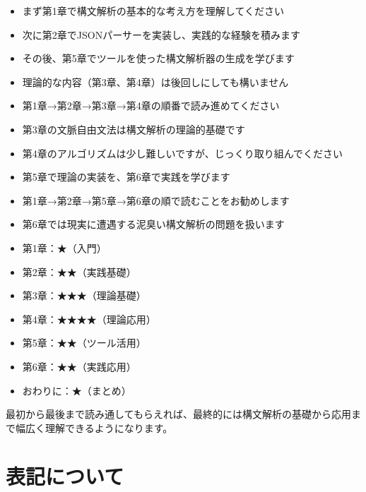 \begin{itemize}
\item
  まず第1章で構文解析の基本的な考え方を理解してください
\item
  次に第2章でJSONパーサーを実装し、実践的な経験を積みます
\item
  その後、第5章でツールを使った構文解析器の生成を学びます
\item
  理論的な内容（第3章、第4章）は後回しにしても構いません
\end{itemize}

\noindent{}

\begin{itemize}
\item
  第1章→第2章→第3章→第4章の順番で読み進めてください
\item
  第3章の文脈自由文法は構文解析の理論的基礎です
\item
  第4章のアルゴリズムは少し難しいですが、じっくり取り組んでください
\item
  第5章で理論の実装を、第6章で実践を学びます
\end{itemize}

\noindent{}

\begin{itemize}
\item
  第1章→第2章→第5章→第6章の順で読むことをお勧めします
\item
  第6章では現実に遭遇する泥臭い構文解析の問題を扱います
\end{itemize}

\noindent{}

\begin{itemize}
\item
  第1章：★（入門）
\item
  第2章：★★（実践基礎）
\item
  第3章：★★★（理論基礎）
\item
  第4章：★★★★（理論応用）
\item
  第5章：★★（ツール活用）
\item
  第6章：★★（実践応用）
\item
  おわりに：★（まとめ）
\end{itemize}

最初から最後まで読み通してもらえれば、最終的には構文解析の基礎から応用まで幅広く理解できるようになります。

\section*{表記について}

